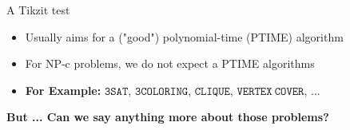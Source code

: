 \begin{frame}[c]{A Tikzit test}
    \begin{itemize}   
        \item Usually aims for a ("good") polynomial-time (PTIME) algorithm
        \pause\item For NP-c problems, we do not expect a PTIME algorithms
        \pause\item \textbf{For Example: } $\mathtt{3SAT}$, $\mathtt{3COLORING}$, $\mathtt{CLIQUE}$, $\mathtt{VERTEX~COVER}$, ...
    \end{itemize}
    
    \begin{center}
    \textbf{But ... Can we say anything more about those problems?}
    \end{center}
\end{frame}